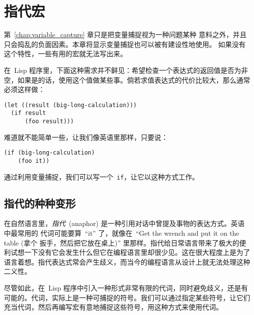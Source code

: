 
\chapter{指代宏}
\label{chap:anaphoric_macros}

第~\ref{chap:variable_capture} 章只是把变量捕捉视为一种问题\pozhehao{}某种
意料之外，并且只会捣乱的负面因素。本章将显示变量捕捉也可以被有建设性地使用。
如果没有这个特性，一些有用的宏就无法写出来。

在~Lisp 程序里，下面这种需求并不鲜见：希望检查一个表达式的返回值是否为非空，如果是的话，使用这个值做某些事。倘若求值表达式的代价比较大，那么通常必须这样做：
\begin{lstlisting}
(let ((result (big-long-calculation)))
  (if result
      (foo result)))
\end{lstlisting}
难道就不能简单一些，让我们像英语里那样，只要说：
\begin{lstlisting}
(if (big-long-calculation)
    (foo it))
\end{lstlisting}
通过利用变量捕捉，我们可以写一个~\texttt{if}，让它以这种方式工作。

\section{指代的种种变形}
\label{sec:anaphoric_variants}

在自然语言里，\emph{指代}~(anaphor) 是一种引用对话中曾提及事物的表达方式。英语中最常用的
代词可能要算~``it'' 了，就像在~``Get the wrench and put it on the table (拿个
扳手，然后把它放在桌上)'' 里那样。指代给日常语言带来了极大的便利\pozhehao{}试想一下没有它会发生什么\pozhehao{}但它在编程语言里却很少见。这在很大程度上是为了语言着想。指代表达式常会产生歧义，而当今的编程语言从设计上就无法处理这种二义性。

尽管如此，在~Lisp 程序中引入一种形式非常有限的代词，同时避免歧义，还是有可能的。代词，实际上是一种可捕捉的符号。我们可以通过指定某些符号，让它们充当代词，然后再编写宏有意地捕捉这些符号，用这种方式来使用代词。

